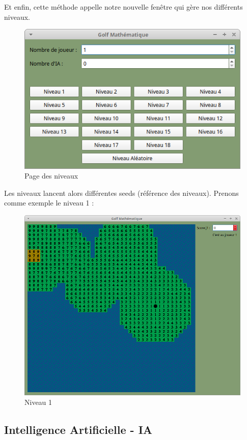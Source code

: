 \documentclass{article}
\begin{document}
Et enfin, cette méthode appelle notre nouvelle fenêtre qui gère nos différents niveaux.\\
\begin{figure}
\centering
\includegraphics[scale=0.5]{Images/niveaux.png}
\caption{Page des niveaux}
\end{figure}
Les niveaux lancent alors différentes seeds (référence des niveaux). Prenons comme exemple le niveau 1 :
\begin{figure}
\centering
\includegraphics[scale=0.3]{Images/niveau1.png}
\caption{Niveau 1}
\end{figure}
\newpage
\subsection{Intelligence Artificielle - IA}
\end{document}
